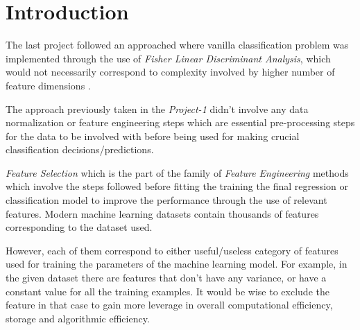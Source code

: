 \documentclass[12pt,twoside,a4paper]{article}
\title{\mytitle}
\author{\myauthors}
\date{\mydate}
\begin{document}
\maketitle

\begin{abstract}

This project primarily deals with feature subset selection for the classification problem through the use of the Taiji sequence dataset. The use of feature selection is to solve the issues of 'Curse of Dimensionality', computational efficiency, easier data collection, storage size, and interpretability through the strategy of dimensionality reduction. Implementations of the feature selection algorithms in this project include \textbf{Filtering} and \textbf{Wrapper} methods. 

\end{abstract}
\vspace{1ex}

\tableofcontents
\pagebreak
\section{Introduction}
The last project followed an approached where vanilla classification problem was implemented through the use of \textit{Fisher Linear Discriminant Analysis}, which would not necessarily correspond to complexity involved by higher number of feature dimensions \cite{ChrisPRML}.

The approach previously taken in the \textit{Project-1} didn't involve any data normalization or feature engineering steps which are essential pre-processing steps for the data to be involved with before being used for making crucial classification decisions/predictions.

\textit{Feature Selection} which is the part of the family of \textit{Feature Engineering} methods which involve the steps followed before fitting the training the final regression or classification model to improve the performance through the use of relevant features. Modern machine learning datasets contain thousands of features corresponding to the dataset used. 

However, each of them correspond to either useful/useless category of features used for training the parameters of the machine learning model. For example, in the given dataset there are features that don't have any variance, or have a constant value for all the training examples. It would be wise to exclude the feature in that case to gain more leverage in overall computational efficiency, storage and algorithmic efficiency.
\end{document}
